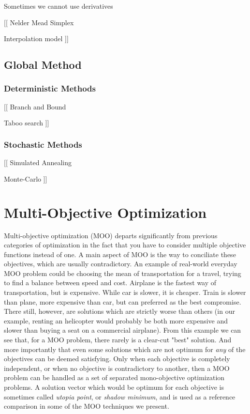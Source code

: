 Sometimes we cannot use derivatives 

[[
Nelder Mead Simplex

Interpolation model
]]

\section{Global Method}

\subsection{Deterministic Methods}

[[
Branch and Bound

Taboo search
]]

\subsection{Stochastic Methods}

[[
Simulated Annealing

Monte-Carlo
]]

\chapter{Multi-Objective Optimization}

Multi-objective optimization (MOO) departs significantly from previous categories of optimization in the fact that you have to consider multiple objective functions instead of one. A main aspect of MOO is the way to conciliate these objectives, which are usually contradictory.
An example of real-world everyday MOO problem could be choosing the mean of transportation for a travel, trying to find a balance between speed and cost. Airplane is the fastest way of transportation, but is expensive. While car is slower, it is cheaper. Train is slower than plane, more expensive than car, but can preferred as the best compromise. There still, however, are solutions which are strictly worse than others (in our example, renting an helicopter would probably be both more expensive and slower than buying a seat on a commercial airplane).
From this example we can see that, for a MOO problem, there rarely is a clear-cut "best" solution. And more importantly that even some solutions which are not optimum for \emph{any} of the objectives can be deemed satisfying. Only when each objective is completely independent, or when no objective is contradictory to another, then a MOO problem can be handled as a set of separated mono-objective optimization problems.
A solution vector which would be optimum for each objective is sometimes called \emph{utopia point}, or \emph{shadow minimum}, and is used as a reference comparison in some of the MOO techniques we present.

